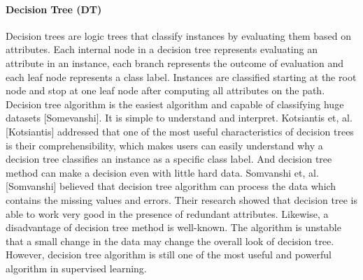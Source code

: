 \documentclass[runningheads]{llncs}
\begin{document}
\paragraph{Decision Tree (DT)\\}
Decision trees are logic trees that classify instances by evaluating them based on attributes. Each internal node in a decision tree represents evaluating an attribute in an instance, each branch represents the outcome of evaluation and each leaf node represents a class label. Instances are classified starting at the root node and stop at one leaf node after computing all attributes on the path. Decision tree algorithm is the easiest algorithm and capable of classifying huge datasets [Somevanshi].
It is simple to understand and interpret. Kotsiantis et, al. [Kotsiantis] addressed that one of the most useful characteristics of decision trees is their comprehensibility, which makes users can easily understand why a decision tree classifies an instance as a specific class label. And decision tree method can make a decision even with little hard data. Somvanshi et, al. [Somvanshi] believed that decision tree algorithm can process the data which contains the missing values and errors. Their research showed that decision tree is able to work very good in the presence of redundant attributes. Likewise, a disadvantage of decision tree method is well-known. The algorithm is unstable that a small change in the data may change the overall look of decision tree. However, decision tree algorithm is still one of the most useful and powerful algorithm in supervised learning. 
%
\end{document}
